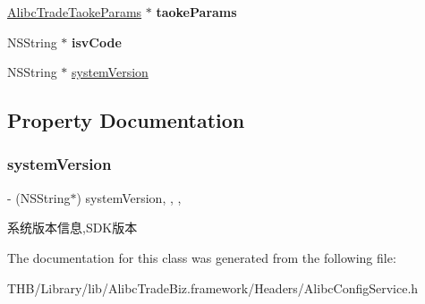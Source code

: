 \begin{DoxyCompactItemize}
\mbox{\label{interface_alibc_config_service_a865558c604dbcacc9c4e49df8237b1ad}} 
\mbox{\hyperlink{interface_alibc_trade_taoke_params}{Alibc\+Trade\+Taoke\+Params}} $\ast$ {\bfseries taoke\+Params}
\item 
\mbox{\label{interface_alibc_config_service_a4560a17e3deedfe7b39ae349d498a9eb}} 
N\+S\+String $\ast$ {\bfseries isv\+Code}
\item 
N\+S\+String $\ast$ \mbox{\hyperlink{interface_alibc_config_service_a54d412940a05c3b9d6b67de7c8a0b33a}{system\+Version}}
\end{DoxyCompactItemize}


\subsection{Property Documentation}
\mbox{\label{interface_alibc_config_service_a54d412940a05c3b9d6b67de7c8a0b33a}} 
\subsubsection{\texorpdfstring{system\+Version}{systemVersion}}
{\footnotesize\ttfamily -\/ (N\+S\+String$\ast$) system\+Version\hspace{0.3cm}{\ttfamily [read]}, {\ttfamily [write]}, {\ttfamily [atomic]}, {\ttfamily [copy]}}

系统版本信息,S\+D\+K版本 

The documentation for this class was generated from the following file\+:\begin{DoxyCompactItemize}
\item 
T\+H\+B/\+Library/lib/\+Alibc\+Trade\+Biz.\+framework/\+Headers/Alibc\+Config\+Service.\+h\end{DoxyCompactItemize}
